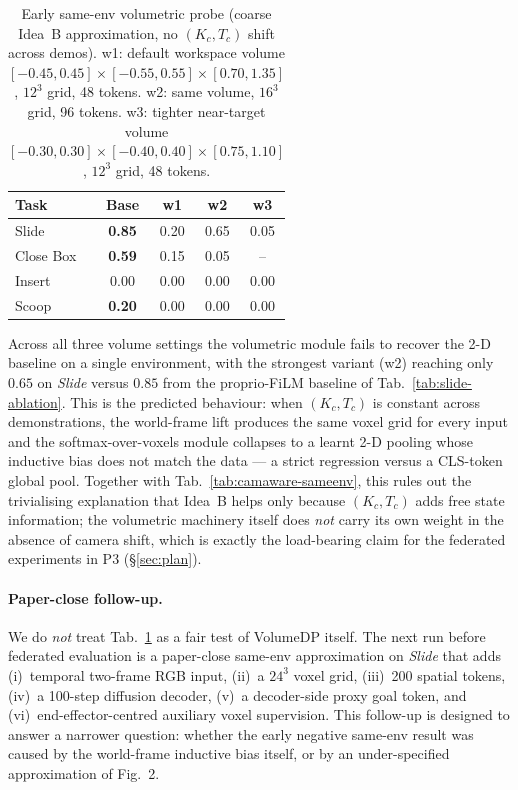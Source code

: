 \documentclass{article}
\begin{document}
\begin{table}[h]
\centering
\footnotesize
\caption{Early same-env volumetric probe (coarse Idea~B
approximation, no $(K_c, T_c)$ shift across demos). w1: default workspace volume
$[-0.45, 0.45]\!\times\![-0.55, 0.55]\!\times\![0.70, 1.35]$,
$12^3$ grid, 48 tokens. w2: same volume, $16^3$ grid, 96 tokens.
w3: tighter near-target volume
$[-0.30, 0.30]\!\times\![-0.40, 0.40]\!\times\![0.75, 1.10]$,
$12^3$ grid, 48 tokens.}
\label{tab:volumedp-sameenv}
\begin{tabular}{lcccc}
\toprule
Task        & Base & w1 & w2 & w3\\
\midrule
Slide       & \textbf{0.85} & 0.20 & 0.65          & 0.05\\
Close Box   & \textbf{0.59} & 0.15 & 0.05          & --\\
Insert      & 0.00          & 0.00 & 0.00          & 0.00\\
Scoop       & \textbf{0.20} & 0.00 & 0.00          & 0.00\\
\bottomrule
\end{tabular}
\end{table}

\noindent Across all three volume settings the volumetric module
fails to recover the 2-D baseline on a single environment, with
the strongest variant (w2) reaching only $0.65$ on \emph{Slide}
versus $0.85$ from the proprio-FiLM baseline of
Tab.~\ref{tab:slide-ablation}. This is the predicted behaviour:
when $(K_c, T_c)$ is constant across demonstrations, the world-frame
lift produces the same voxel grid for every input and the
softmax-over-voxels module collapses to a learnt 2-D pooling whose
inductive bias does not match the data --- a strict regression
versus a CLS-token global pool. Together with
Tab.~\ref{tab:camaware-sameenv}, this rules out the trivialising
explanation that Idea~B helps only because $(K_c, T_c)$ adds free
state information; the volumetric machinery itself does
\emph{not} carry its own weight in the absence of camera shift,
which is exactly the load-bearing claim for the federated
experiments in P3 (\S\ref{sec:plan}).

\paragraph{Paper-close follow-up.}
We do \emph{not} treat Tab.~\ref{tab:volumedp-sameenv} as a fair
test of VolumeDP itself. The next run before federated evaluation
is a paper-close same-env approximation on \emph{Slide} that adds
(i)~temporal two-frame RGB input, (ii)~a $24^3$ voxel grid,
(iii)~200 spatial tokens, (iv)~a 100-step diffusion decoder,
(v)~a decoder-side proxy goal token, and (vi)~end-effector-centred
auxiliary voxel supervision. This follow-up is designed to answer
a narrower question: whether the early negative same-env result was
caused by the world-frame inductive bias itself, or by an
under-specified approximation of Fig.~2.
\end{document}
